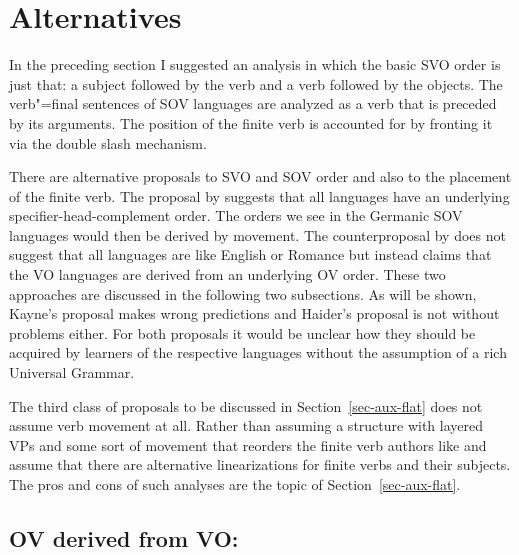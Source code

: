 \section{Alternatives}


In the preceding section I suggested an analysis in which the basic SVO order is just that: a
subject followed by the verb and a verb followed by the objects. The verb"=final sentences of SOV
languages are analyzed as a verb that is preceded by its arguments. The position of the finite verb
is accounted for by fronting it via the double slash mechanism.

There are alternative proposals to SVO and SOV order and also to the placement of the finite
verb. The proposal by \citet{Kayne94a-u} suggests that all languages have an underlying
specifier-head-complement order. The orders we see in the Germanic SOV languages would then be
derived by movement. The counterproposal by \citet{Haider2000a,Haider2020a} does not suggest that all languages are
like English or Romance but instead claims that the VO languages are derived from an underlying OV
order. These two approaches are discussed in the following two subsections. As will be shown,
Kayne's proposal makes wrong predictions and Haider's proposal is not without problems either. For
both proposals it would be unclear how they should be acquired by learners of the respective
languages without the assumption of a rich Universal Grammar.

The third class of proposals to be discussed in Section~\ref{sec-aux-flat} does not assume verb movement at
all. Rather than assuming a structure with layered VPs and some sort of movement that reorders the
finite verb authors like \citet*{GKPS85a} and \citet{Sag2020a} assume that there are alternative
linearizations for finite verbs and their subjects. The pros and cons of such analyses are the topic
of Section~\ref{sec-aux-flat}.

\subsection{OV derived from VO: \citet{Kayne94a-u}}

\citet{Kayne94a-u} 


